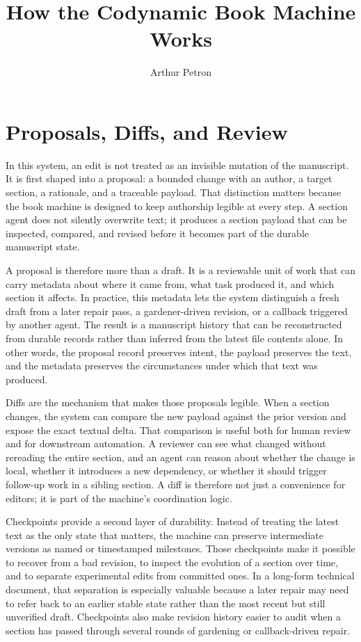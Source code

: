 \documentclass[11pt]{article}
\title{How the Codynamic Book Machine Works}
\author{Arthur Petron}
\begin{document}
\section*{Proposals, Diffs, and Review}

In this system, an edit is not treated as an invisible mutation of the manuscript. It is first shaped into a proposal: a bounded change with an author, a target section, a rationale, and a traceable payload. That distinction matters because the book machine is designed to keep authorship legible at every step. A section agent does not silently overwrite text; it produces a section payload that can be inspected, compared, and revised before it becomes part of the durable manuscript state.

A proposal is therefore more than a draft. It is a reviewable unit of work that can carry metadata about where it came from, what task produced it, and which section it affects. In practice, this metadata lets the system distinguish a fresh draft from a later repair pass, a gardener-driven revision, or a callback triggered by another agent. The result is a manuscript history that can be reconstructed from durable records rather than inferred from the latest file contents alone. In other words, the proposal record preserves intent, the payload preserves the text, and the metadata preserves the circumstances under which that text was produced.

Diffs are the mechanism that makes those proposals legible. When a section changes, the system can compare the new payload against the prior version and expose the exact textual delta. That comparison is useful both for human review and for downstream automation. A reviewer can see what changed without rereading the entire section, and an agent can reason about whether the change is local, whether it introduces a new dependency, or whether it should trigger follow-up work in a sibling section. A diff is therefore not just a convenience for editors; it is part of the machine's coordination logic.

Checkpoints provide a second layer of durability. Instead of treating the latest text as the only state that matters, the machine can preserve intermediate versions as named or timestamped milestones. Those checkpoints make it possible to recover from a bad revision, to inspect the evolution of a section over time, and to separate experimental edits from committed ones. In a long-form technical document, that separation is especially valuable because a later repair may need to refer back to an earlier stable state rather than the most recent but still unverified draft. Checkpoints also make revision history easier to audit when a section has passed through several rounds of gardening or callback-driven repair.
\end{document}
